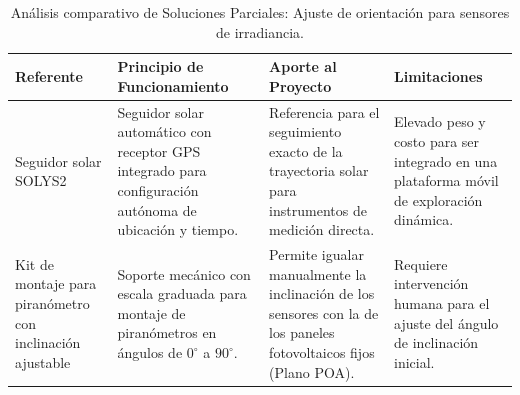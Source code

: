\documentclass[../../General.tex]{subfiles}
\begin{document}
\begin{table}[H]
	\centering
	\footnotesize
	\caption{Análisis comparativo de Soluciones Parciales: Ajuste de orientación para sensores de irradiancia.}
	\label{tab:estado_arte_ajuste_sensores}
	\begin{tabularx}{\textwidth}{|p{3.5cm}|>{\raggedright\arraybackslash}X|>{\raggedright\arraybackslash}X|>{\raggedright\arraybackslash}X|}
		\hline
		\rowcolor[HTML]{D9E1F2} 
		\textbf{Referente} & \textbf{Principio de Funcionamiento} & \textbf{Aporte al Proyecto} & \textbf{Limitaciones} \\ \hline
		Seguidor solar SOLYS2 & Seguidor solar automático con receptor GPS integrado para configuración autónoma de ubicación y tiempo. & Referencia para el seguimiento exacto de la trayectoria solar para instrumentos de medición directa. & Elevado peso y costo para ser integrado en una plataforma móvil de exploración dinámica. \\ \hline
		Kit de montaje para piranómetro con inclinación ajustable & Soporte mecánico con escala graduada para montaje de piranómetros en ángulos de $0^{\circ}$ a $90^{\circ}$. & Permite igualar manualmente la inclinación de los sensores con la de los paneles fotovoltaicos fijos (Plano POA). & Requiere intervención humana para el ajuste del ángulo de inclinación inicial. \\ \hline
	\end{tabularx}
\end{table}
%
%
\end{document}
